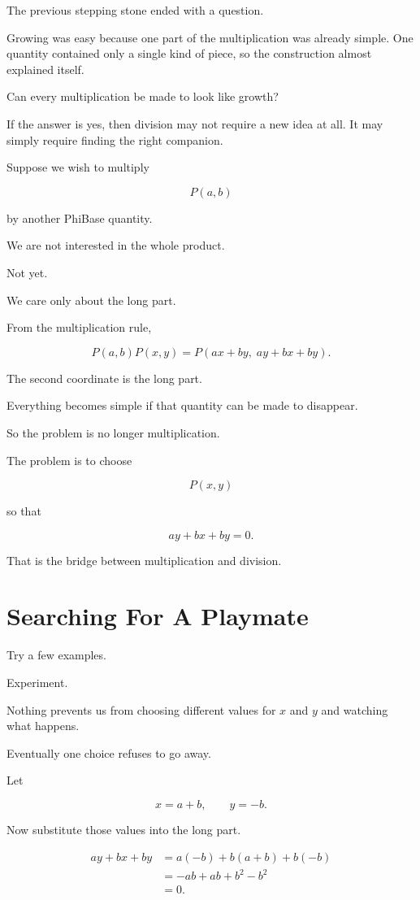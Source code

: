 \label{stone:division}

The previous stepping stone ended with a question.

Growing was easy because one part of the multiplication was already simple. One quantity contained only a single kind of piece, so the construction almost explained itself.

Can every multiplication be made to look like growth?

If the answer is yes, then division may not require a new idea at all. It may simply require finding the right companion.

Suppose we wish to multiply

\[
P(a,b)
\]

by another PhiBase quantity.

We are not interested in the whole product.

Not yet.

We care only about the long part.

From the multiplication rule,

\[
P(a,b)P(x,y)
=
P(ax+by,\;ay+bx+by).
\]

The second coordinate is the long part.

Everything becomes simple if that quantity can be made to disappear.

So the problem is no longer multiplication.

The problem is to choose

\[
P(x,y)
\]

so that

\[
ay+bx+by=0.
\]

That is the bridge between multiplication and division.

\section*{Searching For A Playmate}

Try a few examples.

Experiment.

Nothing prevents us from choosing different values for \(x\) and \(y\) and watching what happens.

Eventually one choice refuses to go away.

Let

\[
x=a+b,
\qquad
y=-b.
\]

Now substitute those values into the long part.

\[
\begin{aligned}
ay+bx+by
 &=a(-b)+b(a+b)+b(-b)\\
 &=-ab+ab+b^{2}-b^{2}\\
 &=0.
\end{aligned}
\]

